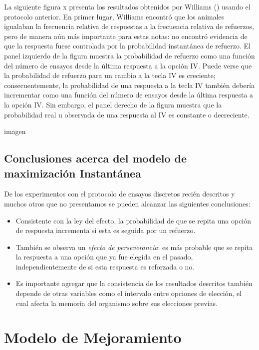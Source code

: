 \documentclass[
  letterpaper,
]{book}
\providecommand{\tightlist}{%
  \setlength{\itemsep}{0pt}\setlength{\parskip}{0pt}}\usepackage{longtable,booktabs,array}
\begin{document}
La siguiente figura x presenta los resultados obtenidos por Williams ()
usando el protocolo anterior. En primer lugar, Williams encontró que los
animales igualaban la frecuencia relativa de respuestas a la frecuencia
relativa de refuerzos, pero de manera aún más importante para estas
notas: no encontró evidencia de que la respuesta fuese controlada por la
probabilidad instantánea de refuerzo. El panel izquierdo de la figura
muestra la probabilidad de refuerzo como una función del número de
ensayos desde la última respuesta a la opción IV. Puede verse que la
probabilidad de refuerzo para un cambio a la tecla IV es creciente;
consecuentemente, la probabilidad de una respuesta a la tecla IV también
debería incrementar como una función del número de ensayos desde la
última respuesta a la opción IV. Sin embargo, el panel derecho de la
figura muestra que la probabilidad real u observada de una respuesta al
IV es constante o decreciente.

imagen

\subsection{Conclusiones acerca del modelo de maximización
Instantánea}\label{conclusiones-acerca-del-modelo-de-maximizaciuxf3n-instantuxe1nea}

De los experimentos con el protocolo de ensayos discretos recién
descritos y muchos otros que no presentamos se pueden alcanzar las
siguientes conclusiones:

\begin{itemize}
\tightlist
\item
  Consistente con la ley del efecto, la probabilidad de que se repita
  una opción de respuesta incrementa si esta es seguida por un refuerzo.
\item
  También se observa un \emph{efecto de perseverancia}: es más probable
  que se repita la respuesta a una opción que ya fue elegida en el
  pasado, independientemente de si esta respuesta es reforzada o no.
\item
  Es importante agregar que la consistencia de los resultados descritos
  también depende de otras variables como el intervalo entre opciones de
  elección, el cual afecta la memoria del organismo sobre sus elecciones
  previas.
\end{itemize}

\section{Modelo de Mejoramiento}\label{modelo-de-mejoramiento}
\end{document}
